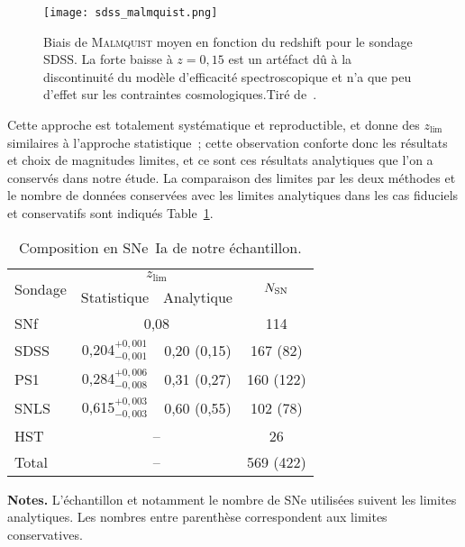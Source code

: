 \documentclass[../main/main.tex]{subfiles}
\begin{document}
\begin{SCfigure}[0.7][ht!]
    \centering
    \texttt{[image: sdss\_malmquist.png]}
    \caption[Biais de \textsc{Malmquist} moyen en fonction du redshift pour le
    sondage SDSS]{Biais de \textsc{Malmquist} moyen en fonction du redshift
        pour le sondage SDSS. La forte baisse à $z=0,15$ est un artéfact dû à la
        discontinuité du modèle d'efficacité spectroscopique et n'a que peu
        d'effet sur les contraintes cosmologiques.\smallbreak Tiré
    de~\cite{conley2011}.}
    \label{fig:sdssmalm}
\end{SCfigure}

Cette approche est totalement systématique et reproductible, et donne des
$z_{\lim}$ similaires à l'approche statistique~; cette observation conforte donc
les résultats et choix de magnitudes limites, et ce sont ces résultats
analytiques que l'on a conservés dans notre étude. La comparaison des limites
par les deux méthodes et le nombre de données conservées avec les limites
analytiques dans les cas fiduciels et conservatifs sont indiqués
Table~\ref{tab:zlimsample}.

\begin{table}[ht]
    \centering
    \begin{threeparttable}
        \caption{Composition en SNe~Ia de notre échantillon.}
        \label{tab:zlimsample}
        \begin{tabular}{lccc}
            \toprule
            \multirow{2}[2]{*}{Sondage} &
            \multicolumn{2}{c}{$z_{\lim}$} &
            \multirow{2}[2]{*}{$N_{\rm SN}$}\\
            \cmidrule(lr){2-3}
            & Statistique & Analytique & \\
            \midrule
            SNf &
            \multicolumn{2}{c}{0,08} &
            114 \\
            SDSS & 
            0,204$^{+0,001}_{-0,001}$ & 0,20 (0,15) &
            167 (82) \\
            PS1 &
            0,284$^{+0,006}_{-0,008}$ & 0,31 (0,27) &
            160 (122) \\
            SNLS &
            0,615$^{+0,003}_{-0,003}$ & 0,60 (0,55) &
            102 (78) \\
            HST &
            \multicolumn{2}{c}{--} &
            26 \\
            \midrule
            Total & \multicolumn{2}{c}{--} &
            569 (422)\\
            \bottomrule
        \end{tabular}
        \begin{tablenotes}[flushleft]
        \item \textbf{\hspace{-3,2pt}Notes.} L'échantillon et notamment le
            nombre de SNe utilisées suivent les limites analytiques. Les nombres
            entre parenthèse correspondent aux limites conservatives.
        \end{tablenotes}
    \end{threeparttable}
\end{table}
\end{document}

